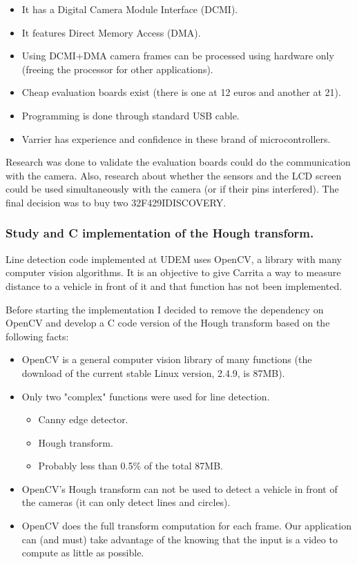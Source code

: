 \begin{itemize}
	\item It has a Digital Camera Module Interface (DCMI).
	\item It features Direct Memory Access (DMA).
	\item Using DCMI+DMA camera frames can be processed using hardware only (freeing the processor for other applications).
	\item Cheap evaluation boards exist (there is one at 12 euros and another at 21).
	\item Programming is done through standard USB cable.
	\item Varrier has experience and confidence in these brand of microcontrollers.
\end{itemize}

Research was done to validate the evaluation boards could do the communication with the camera. Also, research about whether the sensors and the LCD screen could be used simultaneously with the camera (or if their pins interfered). The final decision was to buy two 32F429IDISCOVERY.


\subsubsection{Study and C implementation of the Hough transform.}
Line detection code implemented at UDEM uses OpenCV, a library with many computer vision algorithms. It is an objective to give Carrita a way to measure distance to a vehicle in front of it and that function has not been implemented.

Before starting the implementation I decided to remove the dependency on OpenCV and develop a C code version of the Hough transform based on the following facts:

\begin{itemize}
	\item OpenCV is a general computer vision library of many functions (the download of the current stable Linux version, 2.4.9, is 87MB).
	\item Only two "complex" functions were used for line detection.
	\begin{itemize}
		\item Canny edge detector.
		\item Hough transform.
		\item Probably less than 0.5\% of the total 87MB.
	\end{itemize}
	\item OpenCV's Hough transform can not be used to detect a vehicle in front of the cameras (it can only detect lines and circles).
	\item OpenCV does the full transform computation for each frame. Our application can (and must) take advantage of the knowing that the input is a video to compute as little as possible.
\end{itemize}

